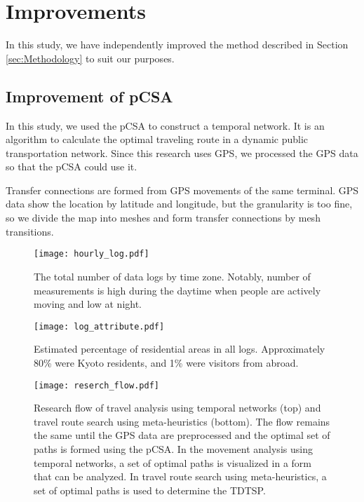 \documentclass[conference]{IEEEtran}
\begin{document}
\section{Improvements}
\label{sec:Improvements}
\par In this study, we have independently improved the method described in Section \ref{sec:Methodology} to suit our purposes.

\subsection{Improvement of pCSA}
\par In this study, we used the pCSA to construct a temporal network.
It is an algorithm to calculate the optimal traveling route in a dynamic public transportation network.
Since this research uses GPS, we processed the GPS data so that the pCSA could use it.
\par Transfer connections are formed from GPS movements of the same terminal.
GPS data show the location by latitude and longitude, but the granularity is too fine, so we divide the map into meshes and form transfer connections by mesh transitions.

\begin{figure}[t]
\begin{center}
\texttt{[image: hourly\_log.pdf]}
\caption{The total number of data logs by time zone.
Notably, number of measurements is high during the daytime when people are actively moving and low at night.}
		\label{fig:hourly_log}
	\end{center}
\end{figure}

\begin{figure}[t]
\begin{center}
\texttt{[image: log\_attribute.pdf]}
\caption{Estimated percentage of residential areas in all logs.
Approximately 80\% were Kyoto residents, and 1\% were visitors from abroad.}
		\label{fig:log_attribute}
	\end{center}
\end{figure}

\begin{figure*}[h]
\begin{center}
\texttt{[image: reserch\_flow.pdf]}
\caption{Research flow of travel analysis using temporal networks (top) and travel route search using meta-heuristics (bottom).
The flow remains the same until the GPS data are preprocessed and the optimal set of paths is formed using the pCSA.
In the movement analysis using temporal networks, a set of optimal paths is visualized in a form that can be analyzed.
In travel route search using meta-heuristics, a set of optimal paths is used to determine the TDTSP.
}
		\label{fig:reserch_flow}
	\end{center}
\end{figure*}
\end{document}
